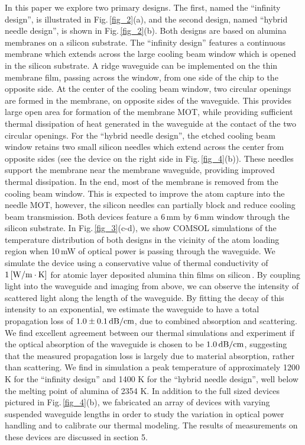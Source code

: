 \documentclass{osa-article}
\begin{document}
In this paper we explore two primary designs. The first, named the ``infinity design'', is illustrated in Fig.\,\ref{fig_2}(a), and the second design, named ``hybrid needle design'', is shown in Fig.\,\ref{fig_2}(b). Both designs are based on alumina membranes on a silicon substrate. The ``infinity design'' features a continuous membrane which extends across the large cooling beam window which is opened in the silicon substrate.  A ridge waveguide can be implemented on the thin membrane film, passing across the window, from one side of the chip to the opposite side. At the center of the cooling beam window, two circular openings are formed in the membrane, on opposite sides of the waveguide. This provides large open area for formation of the membrane MOT, while providing sufficient thermal dissipation of heat generated in the waveguide at the contact of the two circular openings. For the ``hybrid needle design'', the etched cooling beam window retains two small silicon needles which extend across the center from opposite sides (see the device on the right side in Fig.\,\ref{fig_4}(b)). These needles support the membrane near the membrane waveguide, providing improved thermal dissipation. In the end, most of the membrane is removed from the cooling beam window.  This is expected to improve the atom capture into the needle MOT, however, the silicon needles can partially block and reduce cooling beam transmission.  Both devices feature a 6\,mm by 6\,mm window through the silicon substrate.  In Fig.\,\ref{fig_3}(c-d), we show COMSOL simulations of the temperature distribution of both designs in the vicinity of the atom loading region when 10\,mW of optical power is passing through the waveguide. We simulate the device using a conservative value of thermal conductivity of $1\,\rm{[W/m \cdot K]}$ for atomic layer deposited alumina thin films on silicon\,\cite{Hopkins18}.  By coupling light into the waveguide and imaging from above, we can observe the intensity of scattered light along the length of the waveguide.  By fitting the decay of this intensity to an exponential, we estimate the waveguide to have a total propagation loss of $1.0 \pm 0.1\,\rm{dB/cm}$, due to combined absorption and scattering. We find excellent agreement between our thermal simulations and experiment if the optical absorption of the waveguide is chosen to be $1.0 \,\rm{dB/cm}$, suggesting that the measured propagation loss is largely due to material absorption, rather than scattering.  We find in simulation a peak temperature of approximately 1200 K for the ``infinity design'' and 1400 K for the ``hybrid needle design'', well below the melting point of alumina of 2354 K.  In addition to the full sized devices pictured in Fig.\,\ref{fig_4}(b), we fabricated an array of devices with varying suspended waveguide lengths in order to study the variation in optical power handling and to calibrate our thermal modeling. The results of measurements on these devices are discussed in section 5.
\end{document}
